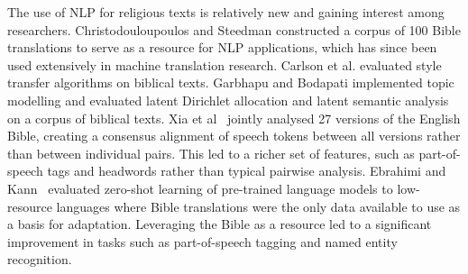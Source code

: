 \documentclass[5p,times]{elsarticle}
\begin{document}
The use of NLP for religious texts is relatively new and gaining interest among researchers. 
Christodouloupoulos and Steedman \cite{christodouloupoulos2015massively} constructed a corpus of 100 Bible translations to serve as a resource for NLP applications, which has since been used extensively in machine translation research.
Carlson et al. \cite{carlson2018evaluating} evaluated style transfer algorithms on biblical texts. Garbhapu and Bodapati \cite{garbhapu2020comparative} implemented topic modelling and evaluated latent Dirichlet allocation and latent semantic analysis on a corpus of biblical texts. 
Xia et al~\cite{xia-yarowsky-2017-deriving} jointly analysed 27 versions of the English Bible, creating a consensus alignment of speech tokens between all versions rather than between individual pairs. This led to a richer set of features, such as part-of-speech tags and headwords rather than typical pairwise analysis. 
Ebrahimi and Kann~\cite{ebrahimi2021adapt} evaluated zero-shot learning of pre-trained language models to low-resource languages where Bible translations were the only data available to use as a basis for adaptation. Leveraging the Bible as a resource led to a significant improvement in tasks such as part-of-speech tagging and named entity recognition.
\end{document}
